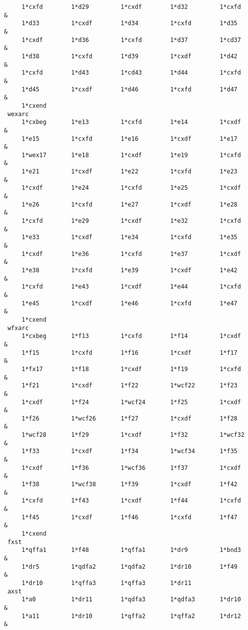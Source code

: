 \begin{footnotesize}
\begin{verbatim}
     1*cxfd        1*d29         1*cxdf        1*d32         1*cxfd     &
     1*d33         1*cxdf        1*d34         1*cxfd        1*d35      &
     1*cxdf        1*d36         1*cxfd        1*d37         1*cd37     &
     1*d38         1*cxfd        1*d39         1*cxdf        1*d42      &
     1*cxfd        1*d43         1*cd43        1*d44         1*cxfd     &
     1*d45         1*cxdf        1*d46         1*cxfd        1*d47      &
     1*cxend
 wexarc
     1*cxbeg       1*e13         1*cxfd        1*e14         1*cxdf     &
     1*e15         1*cxfd        1*e16         1*cxdf        1*e17      &
     1*wex17       1*e18         1*cxdf        1*e19         1*cxfd     &
     1*e21         1*cxdf        1*e22         1*cxfd        1*e23      &
     1*cxdf        1*e24         1*cxfd        1*e25         1*cxdf     &
     1*e26         1*cxfd        1*e27         1*cxdf        1*e28      &
     1*cxfd        1*e29         1*cxdf        1*e32         1*cxfd     &
     1*e33         1*cxdf        1*e34         1*cxfd        1*e35      &
     1*cxdf        1*e36         1*cxfd        1*e37         1*cxdf     &
     1*e38         1*cxfd        1*e39         1*cxdf        1*e42      &
     1*cxfd        1*e43         1*cxdf        1*e44         1*cxfd     &
     1*e45         1*cxdf        1*e46         1*cxfd        1*e47      &
     1*cxend
 wfxarc
     1*cxbeg       1*f13         1*cxfd        1*f14         1*cxdf     &
     1*f15         1*cxfd        1*f16         1*cxdf        1*f17      &
     1*fx17        1*f18         1*cxdf        1*f19         1*cxfd     &
     1*f21         1*cxdf        1*f22         1*wcf22       1*f23      &
     1*cxdf        1*f24         1*wcf24       1*f25         1*cxdf     &
     1*f26         1*wcf26       1*f27         1*cxdf        1*f28      &
     1*wcf28       1*f29         1*cxdf        1*f32         1*wcf32    &
     1*f33         1*cxdf        1*f34         1*wcf34       1*f35      &
     1*cxdf        1*f36         1*wcf36       1*f37         1*cxdf     &
     1*f38         1*wcf38       1*f39         1*cxdf        1*f42      &
     1*cxfd        1*f43         1*cxdf        1*f44         1*cxfd     &
     1*f45         1*cxdf        1*f46         1*cxfd        1*f47      &
     1*cxend
 fxst
     1*qffa1       1*f48         1*qffa1       1*dr9         1*bnd3     &
     1*dr5         1*qdfa2       1*qdfa2       1*dr10        1*f49      &
     1*dr10        1*qffa3       1*qffa3       1*dr11
 axst
     1*a0          1*dr11        1*qdfa3       1*qdfa3       1*dr10     &
     1*a11         1*dr10        1*qffa2       1*qffa2       1*dr12     &

\end{verbatim}
\end{footnotesize}

